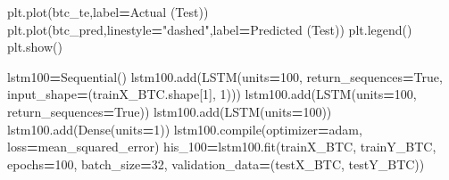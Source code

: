 \documentclass[
]{article}
\newenvironment{Shaded}{\begin{snugshade}}{\end{snugshade}}
\newcommand{\BuiltInTok}[1]{#1}
\newcommand{\DecValTok}[1]{\textcolor[rgb]{0.00,0.00,0.81}{#1}}
\newcommand{\NormalTok}[1]{#1}
\newcommand{\OperatorTok}[1]{\textcolor[rgb]{0.81,0.36,0.00}{\textbf{#1}}}
\newcommand{\StringTok}[1]{\textcolor[rgb]{0.31,0.60,0.02}{#1}}
\newcommand{\VariableTok}[1]{\textcolor[rgb]{0.00,0.00,0.00}{#1}}
\begin{document}
\begin{Shaded}
\begin{Highlighting}[]
\NormalTok{plt.plot(btc\_te,label}\OperatorTok{=}\StringTok{\textquotesingle{}Actual (Test)\textquotesingle{}}\NormalTok{)}
\NormalTok{plt.plot(btc\_pred,linestyle}\OperatorTok{=}\StringTok{"dashed"}\NormalTok{,label}\OperatorTok{=}\StringTok{\textquotesingle{}Predicted (Test)\textquotesingle{}}\NormalTok{)}
\NormalTok{plt.legend()}
\NormalTok{plt.show()}
\end{Highlighting}
\end{Shaded}

\begin{Shaded}
\begin{Highlighting}[]
\NormalTok{lstm100}\OperatorTok{=}\NormalTok{Sequential()}
\NormalTok{lstm100.add(LSTM(units}\OperatorTok{=}\DecValTok{100}\NormalTok{, return\_sequences}\OperatorTok{=}\VariableTok{True}\NormalTok{, input\_shape}\OperatorTok{=}\NormalTok{(trainX\_BTC.shape[}\DecValTok{1}\NormalTok{], }\DecValTok{1}\NormalTok{)))}
\NormalTok{lstm100.add(LSTM(units}\OperatorTok{=}\DecValTok{100}\NormalTok{, return\_sequences}\OperatorTok{=}\VariableTok{True}\NormalTok{))}
\NormalTok{lstm100.add(LSTM(units}\OperatorTok{=}\DecValTok{100}\NormalTok{))}
\NormalTok{lstm100.add(Dense(units}\OperatorTok{=}\DecValTok{1}\NormalTok{))}
\NormalTok{lstm100.}\BuiltInTok{compile}\NormalTok{(optimizer}\OperatorTok{=}\StringTok{\textquotesingle{}adam\textquotesingle{}}\NormalTok{, loss}\OperatorTok{=}\StringTok{\textquotesingle{}mean\_squared\_error\textquotesingle{}}\NormalTok{)}
\NormalTok{his\_100}\OperatorTok{=}\NormalTok{lstm100.fit(trainX\_BTC, trainY\_BTC, epochs}\OperatorTok{=}\DecValTok{100}\NormalTok{, batch\_size}\OperatorTok{=}\DecValTok{32}\NormalTok{, }
\NormalTok{           validation\_data}\OperatorTok{=}\NormalTok{(testX\_BTC, testY\_BTC))}
\end{Highlighting}
\end{Shaded}
\end{document}
